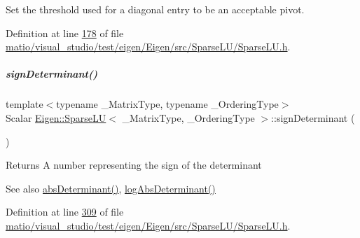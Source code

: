 Set the threshold used for a diagonal entry to be an acceptable pivot. 

Definition at line \hyperlink{matio_2visual__studio_2test_2eigen_2_eigen_2src_2_sparse_l_u_2_sparse_l_u_8h_source_l00178}{178} of file \hyperlink{matio_2visual__studio_2test_2eigen_2_eigen_2src_2_sparse_l_u_2_sparse_l_u_8h_source}{matio/visual\+\_\+studio/test/eigen/\+Eigen/src/\+Sparse\+L\+U/\+Sparse\+L\+U.\+h}.

\mbox{\label{group___sparse_l_u___module_a6651143e3b18fa90cfb3808b6fd23c4e}} 
\subparagraph{\texorpdfstring{sign\+Determinant()}{signDeterminant()}\hspace{0.1cm}{\footnotesize\ttfamily [1/2]}}
{\footnotesize\ttfamily template$<$typename \+\_\+\+Matrix\+Type, typename \+\_\+\+Ordering\+Type$>$ \\
Scalar \hyperlink{group___sparse_l_u___module_class_eigen_1_1_sparse_l_u}{Eigen\+::\+Sparse\+LU}$<$ \+\_\+\+Matrix\+Type, \+\_\+\+Ordering\+Type $>$\+::sign\+Determinant (\begin{DoxyParamCaption}{ }\end{DoxyParamCaption})\hspace{0.3cm}{\ttfamily [inline]}}

\begin{DoxyReturn}{Returns}
A number representing the sign of the determinant
\end{DoxyReturn}
\begin{DoxySeeAlso}{See also}
\hyperlink{group___sparse_l_u___module_a06fa89424239fb169d408f08252426d0}{abs\+Determinant()}, \hyperlink{group___sparse_l_u___module_a89e30a7df205596784a5a73f4768eaec}{log\+Abs\+Determinant()} 
\end{DoxySeeAlso}


Definition at line \hyperlink{matio_2visual__studio_2test_2eigen_2_eigen_2src_2_sparse_l_u_2_sparse_l_u_8h_source_l00309}{309} of file \hyperlink{matio_2visual__studio_2test_2eigen_2_eigen_2src_2_sparse_l_u_2_sparse_l_u_8h_source}{matio/visual\+\_\+studio/test/eigen/\+Eigen/src/\+Sparse\+L\+U/\+Sparse\+L\+U.\+h}.

